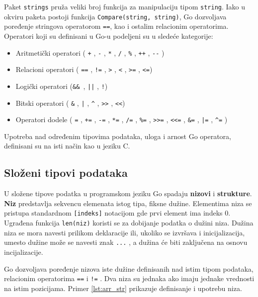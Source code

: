 \documentclass[12pt,oneside]{memoir}
\begin{document}
Paket \texttt{strings} pruža veliki broj funkcija za manipulaciju tipom \texttt{string}. Iako u okviru paketa postoji funkcija \texttt{Compare(string, string)}, Go dozvoljava poređenje stringova operatorom \texttt{==}, kao i ostalim relacionim operatorima.
\\

Operatori koji su definisani u Go-u podeljeni su u sledeće kategorije:
\begin{itemize}

\item Aritmetički operatori ( \texttt{+} ,  \texttt{-} , \texttt{*} ,  \texttt{/} ,  \texttt{\%} ,  \texttt{++} ,   \texttt{-{}-} )
\item Relacioni operatori ( \texttt{==} ,  \texttt{!=} ,  \texttt{>} ,  \texttt{<} ,  \texttt{>=} ,  \texttt{<=})
\item Logički operatori (\texttt{\&\& },  \texttt{||} ,  \texttt{!})
\item Bitski operatori ( \texttt{\&} ,  \texttt{|} ,  \texttt{\^} ,  \texttt{>{}>} ,  \texttt{<{}<})
\item Operatori dodele ( \texttt{=} ,  \texttt{+=} ,  \texttt{-=} ,  \texttt{*=} ,  \texttt{/=} ,  \texttt{\%=} ,   \texttt{>{}>=} ,  \texttt{<{}<=} ,  \texttt{\&=} ,  \texttt{|=} ,  \texttt{\^{}=} )

\end{itemize}

Upotreba nad određenim tipovima podataka, uloga i arnost Go operatora, definisani su na isti način kao u jeziku C.

\subsection{Složeni tipovi podataka}
U složene tipove podatka u programskom jeziku Go spadaju \textbf{nizovi} i \textbf{strukture}.
\\

\textbf{Niz} predstavlja sekvencu elemenata istog tipa, fiksne dužine. Elementima niza se pristupa standardnom \texttt{[indeks]} notacijom gde prvi element ima indeks 0. Ugrađena funkcija \texttt{len(niz)} koristi se za dobijanje podatka o dužini niza. Dužina niza se mora navesti prilikom deklaracije ili, ukoliko se izvršava i inicijalizacija, umesto dužine može se navesti znak \texttt{...} , a dužina će biti zaključena na osnovu incijalizacije.

Go dozvoljava poređenje nizova iste dužine definisanih nad istim tipom podataka, relacionim operatorima \texttt{==} i \texttt{!=} . Dva niza su jednaka ako imaju jednake vrednosti na istim pozicijama. Primer \ref{lst:arr_str} prikazuje definisanje i upotrebu niza.
\\
\end{document}
